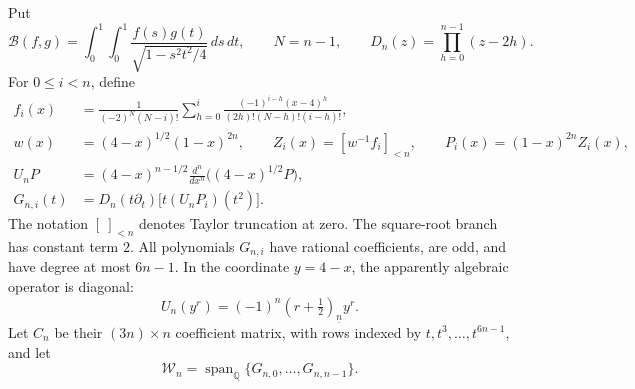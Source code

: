 \documentclass[11pt,a4paper]{article}
\numberwithin{equation}{section}
\theoremstyle{definition}\newtheorem{definition}[theorem]{Definition}
\theoremstyle{remark}\newtheorem{remark}[theorem]{Remark}
\begin{document}
Put
\[
 \mathcal B(f,g)=\int_0^1\!\int_0^1
       \frac{f(s)g(t)}{\sqrt{1-s^2t^2/4}}\,ds\,dt,
 \qquad N=n-1,\qquad D_n(z)=\prod_{h=0}^{n-1}(z-2h).
\]
For $0\le i<n$, define
\begin{align}
 f_i(x)&=\frac{1}{(-2)^N(N-i)!}
   \sum_{h=0}^i\frac{(-1)^{i-h}(x-4)^h}
   {(2h)!(N-h)!(i-h)!},\label{odd:hs:f}\\
 w(x)&=(4-x)^{1/2}(1-x)^{2n},\qquad
 Z_i(x)=[w^{-1}f_i]_{<n},\qquad
 P_i(x)=(1-x)^{2n}Z_i(x),\label{odd:hs:Z}\\
 U_nP&=(4-x)^{n-1/2}\frac{d^n}{dx^n}\big((4-x)^{1/2}P\big),\\
 G_{n,i}(t)&=D_n(t\partial_t)\big[t(U_nP_i)(t^2)\big].\label{odd:hs:G}
\end{align}
The notation $[\ ]_{<n}$ denotes Taylor truncation at zero. The square-root
branch has constant term $2$. All polynomials $G_{n,i}$ have rational
coefficients, are odd, and have degree at most $6n-1$.
In the coordinate $y=4-x$, the apparently algebraic operator is diagonal:
\begin{equation}\label{odd:hs:Udiag}
 U_n(y^r)=(-1)^n(r+\tfrac12)_{\underline n}y^r.
\end{equation}
Let $C_n$ be their $(3n)\times n$ coefficient matrix, with rows indexed by
$t,t^3,\ldots,t^{6n-1}$, and let
\[
 \mathscr W_n=\operatorname{span}_{\mathbb Q}
          \{G_{n,0},\ldots,G_{n,n-1}\}.
\]
\end{document}
